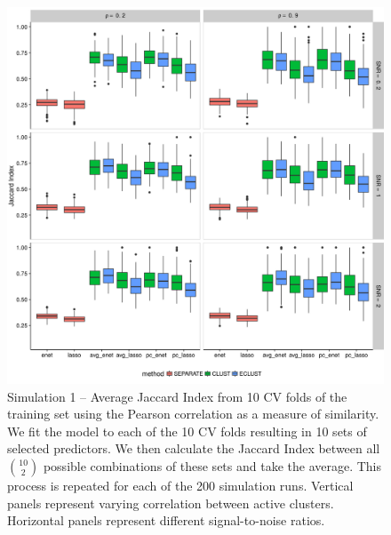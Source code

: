 \begin{figure}[H]
	\centering
	\includegraphics[scale=0.6, keepaspectratio]{./figs/hydra/results/figures/sim1-sept10/jacc_Correlation_sim1.png}
	\caption{Simulation 1 -- Average Jaccard Index from 10 CV folds of the training set using the Pearson correlation as a measure of similarity. We fit the model to each of the 10 CV folds resulting in 10 sets of selected predictors. We then calculate the Jaccard Index between all $\binom{10}{2}$ possible combinations of these sets and take the average. This process is repeated for each of the 200 simulation runs. Vertical panels represent varying correlation between active clusters. Horizontal panels represent different signal-to-noise ratios.}
	\label{fig:jacc_Correlation_sim1}
\end{figure}


